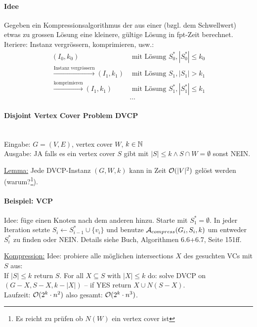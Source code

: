 \paragraph{Idee}
Gegeben ein Kompressionsalgorithmus der aus einer (bzgl. dem Schwellwert) etwas zu grossen Lösung eine kleinere,
gültige Lösung in fpt-Zeit berechnet.
Iteriere: Instanz vergrössern, komprimieren, usw.:
\\
\begin{align*}
(I_0, k_0) & \text{ mit Lösung } S_0^*, |S_0^*| \leq k_0 \\
\xrightarrow{\text{Instanz vergrössern}}
(I_1, k_1) & \text{ mit Lösung } S_1,   |S_1|   > k_1 \\
\xrightarrow{\text{komprimieren}}
(I_1, k_1) & \text{ mit Lösung } S_1^*, |S_1^*| \leq k_1 \\
& \dots
\end{align*}

\paragraph{Disjoint Vertex Cover Problem DVCP} \mbox{} \\
Eingabe: $G=(V,E)$, vertex cover $W$, $k \in \mathbb{N}$ \\
Ausgabe: JA falls es ein vertex cover $S$ gibt mit $|S| \leq k \wedge S \cap W = \emptyset$ sonst NEIN.

\underline{Lemma:}
Jede DVCP-Instanz $(G, W, k)$ kann in Zeit $\mathcal{O} (|V|^2)$ gelöst werden (warum?\footnote{
Es reicht zu prüfen ob $N(W)$ ein vertex cover ist}).

\paragraph{Beispiel: VCP}
Idee: füge einen Knoten nach dem anderen hinzu.
Starte mit $S_1^* = \emptyset$. In jeder Iteration setzte $S_i \leftarrow S_{i-1}^* \cup \{v_i\}$ und benutze
$\mathcal{A}_{compress}(G_i, S_i, k)$ um entweder $S_i^*$ zu finden oder NEIN.
Details siehe Buch, Algorithmen 6.6+6.7, Seite 151ff.

\underline{Kompression:} Idee: probiere alle möglichen intersections $X$ des gesuchten VCs mit $S$ aus: \\
If $|S| \leq k$ return $S$.
For all $X \subseteq S$ with $|X| \leq k$ do:
solve DVCP on $(G-X, S-X, k-|X|)$
-- if YES return $X \cup N(S-X)$.
\\
Laufzeit: $\mathcal{O} (2^k \cdot n^2)$ also gesamt: $\mathcal{O} (2^k \cdot n^3)$.



